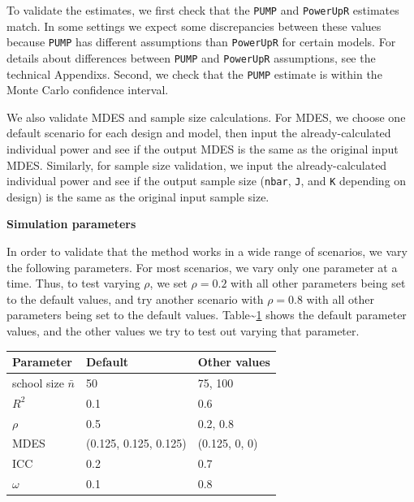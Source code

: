 \documentclass[
]{article}
\begin{document}
To validate the estimates, we first check that the \texttt{PUMP} and
\texttt{PowerUpR} estimates match. In some settings we expect some
discrepancies between these values because \texttt{PUMP} has different
assumptions than \texttt{PowerUpR} for certain models. For details about
differences between \texttt{PUMP} and \texttt{PowerUpR} assumptions, see
the technical Appendixs. Second, we check that the \texttt{PUMP}
estimate is within the Monte Carlo confidence interval.

We also validate MDES and sample size calculations. For MDES, we choose
one default scenario for each design and model, then input the
already-calculated individual power and see if the output MDES is the
same as the original input MDES. Similarly, for sample size validation,
we input the already-calculated individual power and see if the output
sample size (\texttt{nbar}, \texttt{J}, and \texttt{K} depending on
design) is the same as the original input sample size.

\textbf{Simulation parameters}

In order to validate that the method works in a wide range of scenarios,
we vary the following parameters. For most scenarios, we vary only one
parameter at a time. Thus, to test varying \(\rho\), we set
\(\rho = 0.2\) with all other parameters being set to the default
values, and try another scenario with \(\rho = 0.8\) with all other
parameters being set to the default values.
Table\textasciitilde{}\ref{tab:val_params} shows the default parameter
values, and the other values we try to test out varying that parameter.

\begin{table}
\centering
\begin{tabular}{l l l}
Parameter               & Default                & Other values \\ \hline
school size $\bar{n}$   & 50                     & 75, 100           \\
$R^2$                   & 0.1                    & 0.6               \\
$\rho$                  & 0.5                    & 0.2, 0.8          \\
MDES                    & (0.125, 0.125, 0.125)  & (0.125, 0, 0)     \\
ICC                     & 0.2                    & 0.7               \\
$\omega$                & 0.1                    & 0.8               \\
\end{tabular}
\label{tab:val_params}
\end{table}
\end{document}
